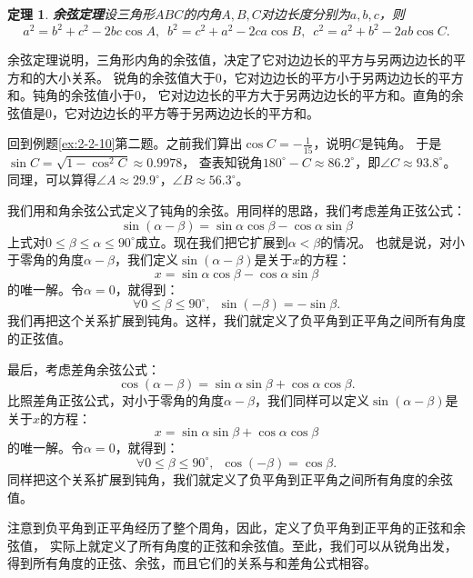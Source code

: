 \documentclass[12pt,UTF8]{ctexbook}
\newtheorem{tm}{定理}[section]
\begin{document}
\begin{tm}{\textbf{余弦定理}}\label{tm:2-4-10}
    设三角形$ABC$的内角$A,B,C$对边长度分别为$a,b,c$，则
    $$ a^2 = b^2 + c^2 - 2bc\cos A, \,\,\, b^2 = c^2 + a^2 - 2ca\cos B, \,\,\, c^2 = a^2 + b^2 - 2ab\cos C. $$
\end{tm}
余弦定理说明，三角形内角的余弦值，决定了它对边边长的平方与另两边边长的平方和的大小关系。
锐角的余弦值大于$0$，它对边边长的平方小于另两边边长的平方和。钝角的余弦值小于$0$，
它对边边长的平方大于另两边边长的平方和。直角的余弦值是$0$，它对边边长的平方等于另两边边长的平方和。

回到例题\ref{ex:2-2-10}第二题。之前我们算出$\cos C = -\frac{1}{15}$，说明$C$是钝角。
于是$\sin C = \sqrt{1 - \cos^2 C} \approx 0.9978$，
查表知锐角$180^\circ - C \approx 86.2^\circ$，即$\angle C \approx 93.8^\circ$。
同理，可以算得$\angle A \approx 29.9^\circ$，$\angle B \approx 56.3^\circ$。

我们用和角余弦公式定义了钝角的余弦。用同样的思路，我们考虑差角正弦公式：
$$ \sin(\alpha - \beta) = \sin\alpha \cos \beta - \cos \alpha \sin\beta $$
上式对$0 \leqslant \beta \leqslant \alpha \leqslant 90^\circ$成立。现在我们把它扩展到$\alpha < \beta$的情况。
也就是说，对小于零角的角度$\alpha - \beta$，我们定义$\sin (\alpha - \beta)$是关于$x$的方程：
$$ x = \sin\alpha \cos \beta - \cos \alpha \sin\beta $$
的唯一解。令$\alpha = 0$，就得到：
$$ \forall 0 \leqslant \beta \leqslant 90^\circ , \,\,\, \sin(- \beta) = -\sin\beta. $$
我们再把这个关系扩展到钝角。这样，我们就定义了负平角到正平角之间所有角度的正弦值。

最后，考虑差角余弦公式：
$$ \cos(\alpha - \beta) = \sin\alpha \sin \beta +  \cos \alpha \cos \beta. $$
比照差角正弦公式，对小于零角的角度$\alpha - \beta$，我们同样可以定义$\sin (\alpha - \beta)$是关于$x$的方程：
$$ x = \sin\alpha \sin \beta +  \cos \alpha \cos \beta $$
的唯一解。令$\alpha = 0$，就得到：
$$ \forall 0 \leqslant \beta \leqslant 90^\circ , \,\,\, \cos(- \beta) = \cos \beta. $$
同样把这个关系扩展到钝角，我们就定义了负平角到正平角之间所有角度的余弦值。

注意到负平角到正平角经历了整个周角，因此，定义了负平角到正平角的正弦和余弦值，
实际上就定义了所有角度的正弦和余弦值。至此，我们可以从锐角出发，
得到所有角度的正弦、余弦，而且它们的关系与和差角公式相容。
\end{document}
